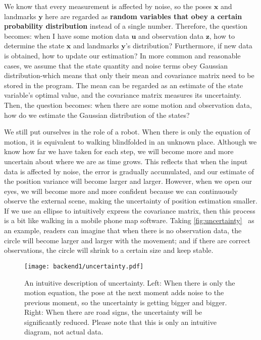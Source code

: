 We know that every measurement is affected by noise, so the poses $\mathbf{x}$ and landmarks $\mathbf{y}$ here are regarded as \textbf{random variables that obey a certain probability distribution} instead of a single number. Therefore, the question becomes: when I have some motion data $\mathbf{u}$ and observation data $\mathbf{z}$, how to determine the state $\mathbf{x}$ and landmarks $\mathbf{y}$'s distribution? Furthermore, if new data is obtained, how to update our estimation? In more common and reasonable cases, we assume that the state quantity and noise terms obey Gaussian distribution-which means that only their mean and covariance matrix need to be stored in the program. The mean can be regarded as an estimate of the state variable's optimal value, and the covariance matrix measures its uncertainty. Then, the question becomes: when there are some motion and observation data, how do we estimate the Gaussian distribution of the states?

We still put ourselves in the role of a robot. When there is only the equation of motion, it is equivalent to walking blindfolded in an unknown place. Although we know how far we have taken for each step, we will become more and more uncertain about where we are as time grows. This reflects that when the input data is affected by noise, the error is gradually accumulated, and our estimate of the position variance will become larger and larger. However, when we open our eyes, we will become more and more confident because we can continuously observe the external scene, making the uncertainty of position estimation smaller. If we use an ellipse to intuitively express the covariance matrix, then this process is a bit like walking in a mobile phone map software. Taking \autoref{fig:uncertainty}~ as an example, readers can imagine that when there is no observation data, the circle will become larger and larger with the movement; and if there are correct observations, the circle will shrink to a certain size and keep stable.

\begin{figure}[!ht]
	\centering
	\texttt{[image: backend1/uncertainty.pdf]}
	\caption{An intuitive description of uncertainty. Left: When there is only the motion equation, the pose at the next moment adds noise to the previous moment, so the uncertainty is getting bigger and bigger. Right: When there are road signs, the uncertainty will be significantly reduced. Please note that this is only an intuitive diagram, not actual data.}
	\label{fig:uncertainty}
\end{figure}

